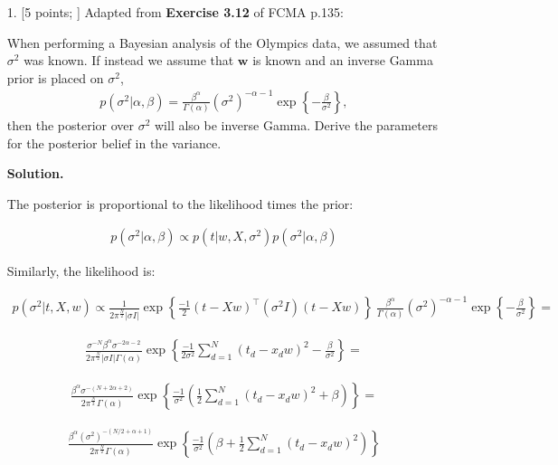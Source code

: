 \documentclass[10pt]{article}
\begin{document}
\newpage
\begin{itemize}

\item[1.]  [5 points; \boldred{Required only for Graduates}]
Adapted from {\bf Exercise 3.12} of FCMA p.135:

When performing a Bayesian analysis of the Olympics data, we assumed that $\sigma^2$ was known.  If instead we assume that $\mathbf{w}$ is known and an inverse Gamma prior is placed on $\sigma^2$,
\begin{eqnarray*}
p(\sigma^2 | \alpha, \beta) = \frac{\beta^{\alpha}}{\Gamma(\alpha)} (\sigma^2)^{-\alpha-1} \exp \left\{-\frac{\beta}{\sigma^2} \right\},
\end{eqnarray*}
then the posterior over $\sigma^2$ will also be inverse Gamma.  Derive the parameters for the posterior belief in the variance.  

{\bf Solution.}

The posterior is proportional to the likelihood times the prior:

\begin{align*}
    p(\sigma^2 | \alpha, \beta) \propto
    p(t | w, X, \sigma^2) p(\sigma^2 | \alpha, \beta)
\end{align*}

Similarly, the likelihood is:

\begin{align*}
    p(\sigma^2 | t, X, w) \propto
    \frac{1}{2\pi^{\frac{N}{2}} |\sigma I|}
    \exp \left\{ \frac{-1}{2} (t - Xw)^\top (\sigma^2 I) (t - Xw) \right\}\
    \frac{\beta^{\alpha}}{\Gamma(\alpha)}
    (\sigma^2)^{-\alpha-1} \exp \left\{-\frac{\beta}{\sigma^2} \right\} =
\end{align*}

\begin{align*}
    \frac{\sigma^{-N}\beta^{\alpha}\sigma^{-2\alpha-2}}{2\pi^{\frac{N}{2}} |\sigma I|\Gamma(\alpha)}
    \exp \left\{ \frac{-1}{2\sigma^2} \sum^{N}_{d=1} (t_d - x_d w)^2 - \frac{\beta}{\sigma^2} \right\} =
\end{align*}

\begin{align*}
    \frac{\beta^{\alpha} \sigma^{-(N+2\alpha+2)}}{2\pi^{\frac{N}{2}} \Gamma(\alpha)} \exp \left\{ \frac{-1}{\sigma^2} (\frac{1}{2} \sum^{N}_{d=1} (t_d - x_d w)^2 + \beta ) \right\} =
\end{align*}
    
\begin{align*}
    \frac{\beta^{\alpha} (\sigma^2)^{-(N/2+\alpha+1)}}{2\pi^{\frac{N}{2}} \Gamma(\alpha)} \exp \left\{ \frac{-1}{\sigma^2} (\beta +\frac{1}{2} \sum^{N}_{d=1} (t_d - x_d w)^2 ) \right\}
\end{align*}


\end{itemize}
\end{document}
